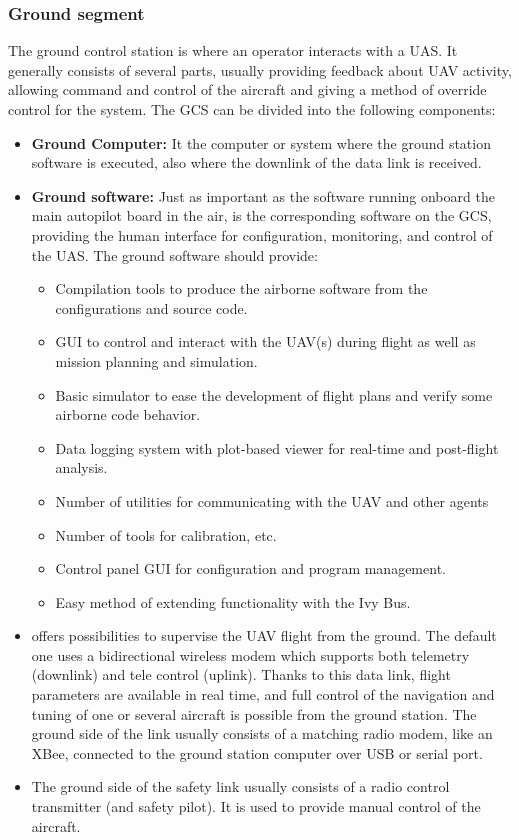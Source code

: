 \subsubsection{Ground segment} 
The ground control station is where an operator interacts with a UAS. It generally consists of several parts, usually providing feedback about UAV activity, allowing command and control of the aircraft and giving a method of override control for the system.
The GCS can be divided into the following components:
\begin{itemize}
    \item \textbf{Ground Computer:} It the computer or system where the ground station software is executed, also where the downlink of the data link is received.
    \item \textbf{Ground software:} Just as important as the software running onboard the main autopilot board in the air, is the corresponding software on the GCS, providing the human interface for configuration, monitoring, and control of the UAS. The ground software should provide:
    \begin{itemize}
        \item Compilation tools to produce the airborne software from the configurations and source code.
        \item GUI to control and interact with the UAV(s) during flight as well as mission planning and simulation.
        \item Basic simulator to ease the development of flight plans and verify some airborne code behavior.
        \item Data logging system with plot-based viewer for real-time and post-flight analysis.
        \item Number of utilities for communicating with the UAV and other agents
        \item Number of tools for calibration, etc.
        \item Control panel GUI for configuration and program management.
        \item Easy method of extending functionality with the Ivy Bus.
    \end{itemize}
    \item {} offers possibilities to supervise the UAV flight from the ground. The default one uses a bidirectional wireless modem which supports both telemetry (downlink) and tele control (uplink). Thanks to this data link, flight parameters are available in real time, and full control of the navigation and tuning of one or several aircraft is possible from the ground station. The ground side of the link usually consists of a matching radio modem, like an XBee, connected to the ground station computer over USB or serial port.
    \item {} The ground side of the safety link usually consists of a radio control transmitter (and safety pilot). It is used to provide manual control of the aircraft.
\end{itemize}
